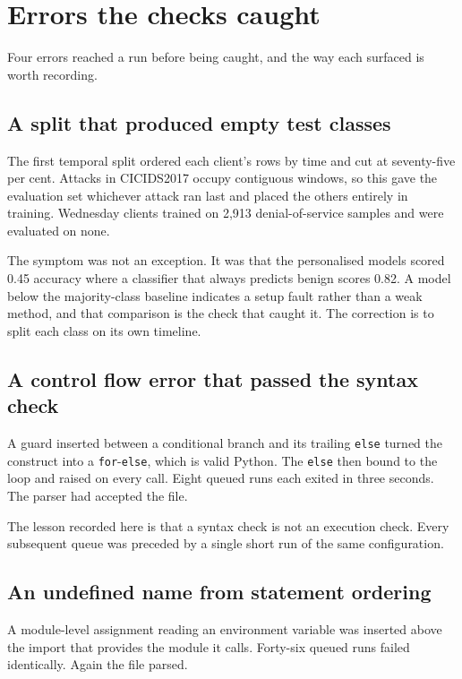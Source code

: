 \section{Errors the checks caught}
\label{sec:errors-caught}

Four errors reached a run before being caught, and the way each surfaced is
worth recording.

\subsection{A split that produced empty test classes}

The first temporal split ordered each client's rows by time and cut at
seventy-five per cent. Attacks in CICIDS2017 occupy contiguous windows, so this
gave the evaluation set whichever attack ran last and placed the others entirely
in training. Wednesday clients trained on 2,913 denial-of-service samples and
were evaluated on none.

The symptom was not an exception. It was that the personalised models scored
0.45 accuracy where a classifier that always predicts benign scores 0.82. A
model below the majority-class baseline indicates a setup fault rather than a
weak method, and that comparison is the check that caught it. The correction is
to split each class on its own timeline.

\subsection{A control flow error that passed the syntax check}

A guard inserted between a conditional branch and its trailing \texttt{else}
turned the construct into a \texttt{for}-\texttt{else}, which is valid Python.
The \texttt{else} then bound to the loop and raised on every call. Eight queued
runs each exited in three seconds. The parser had accepted the file.

The lesson recorded here is that a syntax check is not an execution check. Every
subsequent queue was preceded by a single short run of the same configuration.

\subsection{An undefined name from statement ordering}

A module-level assignment reading an environment variable was inserted above the
import that provides the module it calls. Forty-six queued runs failed
identically. Again the file parsed.

